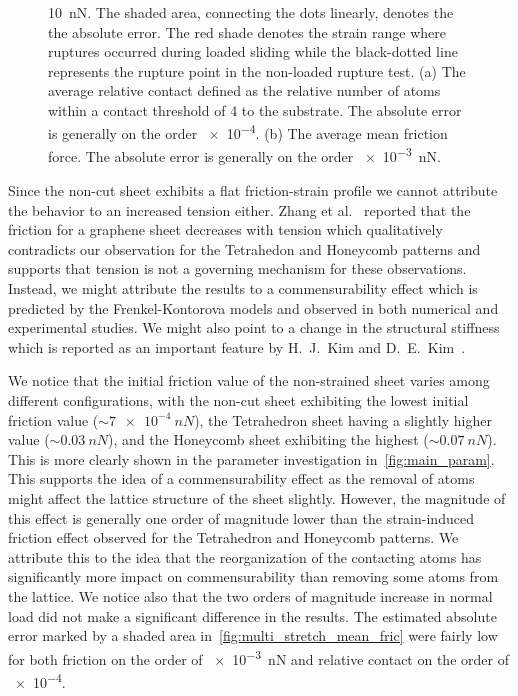 \begin{figure}[H]
{     \SI{10}{nN}. The shaded area, connecting the dots linearly, denotes the
     the absolute error. The red shade denotes the strain range where ruptures
     occurred during loaded sliding while the black-dotted line represents the rupture
     point in the non-loaded rupture test. (a) The average relative contact
     defined as the relative number of atoms within a contact threshold of
     \SI{4}{} to the substrate. The absolute error is generally on the
     order \num{e-4}. (b) The average mean friction force. The absolute error is generally on the order \SI{e-3}{nN}.}
     \label{fig:multi_stretch}
\end{figure}



Since the non-cut sheet exhibits a
flat friction-strain profile we cannot attribute the behavior to an increased
tension either. Zhang et al.~\cite{zhang_tuning_2019} reported that the friction
for a graphene sheet decreases with tension which qualitatively contradicts our
observation for the Tetrahedon and Honeycomb patterns and supports that tension is not a governing mechanism for these observations. Instead, we
might attribute the results to a commensurability effect which is predicted by the Frenkel-Kontorova models and observed in both numerical and experimental studies. We might also point to a change in the structural stiffness which is reported as an important feature by H.\ J.\ Kim and D.\ E.\ Kim~\cite{Kim_2012}. 

We notice that the initial friction value of the non-strained sheet varies among different configurations, with the non-cut sheet exhibiting the lowest initial friction value ($\sim \SI{7e-4}{nN}$), the Tetrahedron sheet having a slightly higher value ($\sim \SI{0.03}{nN}$), and the Honeycomb sheet exhibiting the highest ($\sim \SI{0.07}{nN}$). This is more clearly shown in the parameter investigation in~\cref{fig:main_param}. This supports the idea of a commensurability effect as the removal of atoms might affect the lattice structure of the sheet slightly. However, the magnitude of this effect is generally one order of magnitude lower than the strain-induced friction effect observed for the Tetrahedron and Honeycomb patterns. We attribute this to the idea that the reorganization of the contacting atoms has significantly more impact on commensurability than removing some atoms from the lattice. We notice also that the two orders of magnitude increase in normal load did not
make a significant difference in the results. The estimated absolute error
marked by a shaded area in~\cref{fig:multi_stretch_mean_fric} were fairly low
for both friction on the order of \SI{e-3}{nN} and relative contact on the order of
\num{e-4}.


